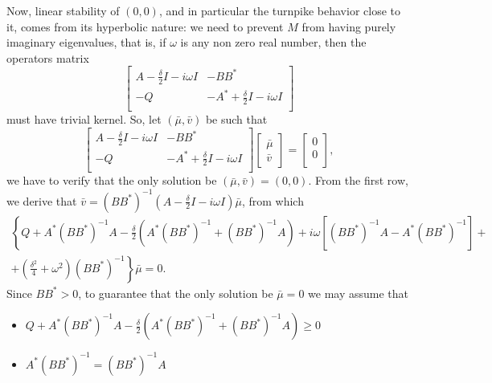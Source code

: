 \documentclass[10pt,a4paper,nouppercase,nowrite]{article}
\numberwithin{equation}{section}
\theoremstyle{definition}
\begin{document}
	Now, linear stability of $(0,0)$, and in particular the turnpike behavior close to it, comes from its hyperbolic nature: we need to prevent $M$ from having purely imaginary eigenvalues, that is, if $\omega$ is any non zero real number, then the operators matrix
	\begin{equation*}
		\begin{bmatrix}
			A-\frac{\delta}{2} I -i\omega I & -BB^{*} \\
			-Q & -A^{*} +\frac{\delta}{2} I - i\omega I \\
		\end{bmatrix}
	\end{equation*}
	must have trivial kernel. So, let $(\bar{\mu},\bar{v})$ be such that 
	\begin{equation*}
		\begin{bmatrix}
			A-\frac{\delta}{2} I -i\omega I & -BB^{*} \\
			-Q & -A^{*} +\frac{\delta}{2} I - i\omega I \\
		\end{bmatrix}
		\begin{bmatrix}
			\bar{\mu} \\
			\bar{v}
		\end{bmatrix}
		=
		\begin{bmatrix}
			0 \\
			0 \\
		\end{bmatrix}
		,
	\end{equation*}
	we have to verify that the only solution be $(\bar{\mu},\bar{v})=(0,0)$. From the first row, we derive that $\bar{v}=(BB^{*})^{-1} (A-\frac{\delta}{2} I - i\omega I ) \bar{\mu}$, from which 
	\begin{multline*}
		\left \{ Q+A^{*}(BB^{*})^{-1}A - \frac{\delta}{2} \left( A^{*} (BB^{*})^{-1} + (BB^{*})^{-1} A \right) + i\omega \left[ (BB^{*})^{-1}A - A^{*}(BB^{*})^{-1} \right] + \right. \\ \left. + \left( \frac{\delta^2}{4} + \omega^2 \right) (BB^{*})^{-1} \right \} \bar{\mu} = 0.
	\end{multline*}
	Since $BB^{*} > 0$, to guarantee that the only solution be $\bar{\mu}=0$ we may assume that
	\begin{itemize}
		\item[\textit{(i)}] $Q+A^{*}(BB^{*})^{-1} A - \frac{\delta}{2} \left( A^{*} (BB^{*})^{-1} + (BB^{*})^{-1} A \right)  \geq 0$ %
		\item[\textit{(ii)}] $A^{*} (BB^{*})^{-1} = (BB^{*})^{-1} A$ %
	\end{itemize}
	
\end{document}
